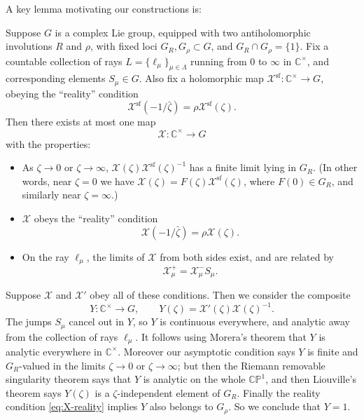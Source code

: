 \documentclass[12pt,letterpaper,reqno]{article}
\numberwithin{equation}{section}
\newcommand{\cX}{\ensuremath{\mathcal X}}
\newcommand{\C}{\ensuremath{\mathbb C}}
\newcommand{\PP}{\ensuremath{\mathbb P}}
\renewcommand{\sf}{\mathrm{sf}}
\newcommand{\fixme}[1]{{\color{orange}{[#1]}}}
\begin{document}
A key lemma motivating our constructions is:

\begin{lem} \label{lem:rh-uniqueness}
Suppose $G$ is a complex Lie group, equipped with two antiholomorphic
involutions $R$ and $\rho$, with fixed loci $G_R, G_\rho \subset G$,
and $G_R \cap G_\rho = \{1\}$.
Fix a countable collection of rays $L = \{\ell_\mu\}_{\mu \in \Lambda}$
running from $0$ to $\infty$ in $\C^\times$,
and corresponding elements $S_\mu \in G$.
Also fix a holomorphic map $\cX^\sf: \C^\times \to G$,
obeying the ``reality'' condition
\begin{equation} \label{eq:Xsf-reality}
  \cX^\sf(-1/\bar\zeta) = \rho \cX^\sf(\zeta).
\end{equation}
Then there exists at most one map
$$ \cX: \C^\times \to G $$
with the properties:
\begin{itemize}
\item As $\zeta \to 0$ or $\zeta \to \infty$, $\cX(\zeta) \cX^\sf(\zeta)^{-1}$ has a finite limit lying in $G_R$.
(In other words, near $\zeta = 0$ we have $\cX(\zeta) = F(\zeta) \cX^\sf(\zeta)$, where $F(0) \in G_R$, and similarly near $\zeta = \infty$.)
\item $\cX$ obeys the ``reality'' condition
\begin{equation} \label{eq:X-reality}
  \cX(-1/\bar\zeta) = \rho \cX(\zeta).
\end{equation}
\item On the ray $\ell_\mu$, the limits of $\cX$ from both sides
exist, and are related by
\begin{equation}
  \cX^+_\mu = \cX^-_\mu S_\mu.
\end{equation}
\end{itemize}

\end{lem}

\begin{pf} Suppose $\cX$ and $\cX'$ obey all of these conditions.
Then we consider the composite
\begin{equation}
  Y: \C^\times \to G, \qquad Y(\zeta) = \cX'(\zeta)\cX(\zeta)^{-1}.
\end{equation}
The jumps $S_\mu$ cancel out in $Y$, so $Y$ is continuous
everywhere, and analytic away from the collection of rays $\ell_\mu$.
It follows using Morera's theorem that $Y$ is analytic
everywhere in $\C^\times$. \fixme{even if the $\ell_\mu$ are dense?}
Moreover our asymptotic condition says $Y$ is finite
and $G_R$-valued in the limits
$\zeta \to 0$ or $\zeta \to \infty$; but then the Riemann removable
singularity theorem says that $Y$ is analytic on the whole
$\C\PP^1$, and then Liouville's theorem says
$Y(\zeta)$ is a $\zeta$-independent element of $G_R$. Finally
the reality condition \eqref{eq:X-reality} implies $Y$
also belongs to $G_\rho$. So we conclude that $Y = 1$.
\end{pf}
\end{document}
